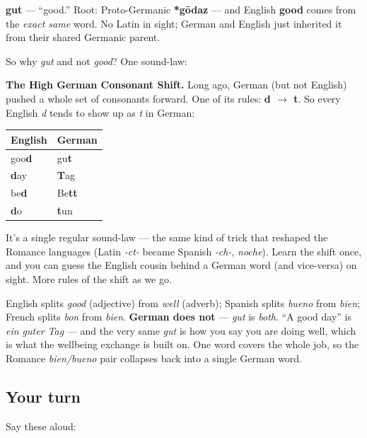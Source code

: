 \begin{cousinweb}
\textbf{gut} — \textquotedblleft{}good.\textquotedblright{} Root: Proto-Germanic \textbf{*gōdaz} — and English \textbf{good} comes from the \emph{exact same} word. No Latin in sight; German and English just inherited it from their shared Germanic parent.

So why \emph{gut} and not \emph{good}? One sound-law:

\textbf{The High German Consonant Shift.} Long ago, German (but not English) pushed a whole set of consonants forward. One of its rules: \textbf{d $\to$ t}. So every English \emph{d} tends to show up as \emph{t} in German:

\noindent
\begin{tabularx}{\linewidth}{@{}>{\raggedright\arraybackslash}X>{\raggedright\arraybackslash}X@{}}
\toprule
\textbf{English} & \textbf{German} \\
\midrule
goo\textbf{d} & gu\textbf{t} \\
\textbf{d}ay & \textbf{T}ag \\
be\textbf{d} & Be\textbf{tt} \\
\textbf{d}o & \textbf{t}un \\
\bottomrule
\end{tabularx}

It's a single regular sound-law — the same kind of trick that reshaped the Romance languages (Latin \emph{-ct-} became Spanish \emph{-ch-}, \emph{noche}). Learn the shift once, and you can guess the English cousin behind a German word (and vice-versa) on sight. More rules of the shift as we go.
\end{cousinweb}

\begin{grammarlens}[title={Grammar Lens: German merges \textquotedblleft{}good\textquotedblright{} and \textquotedblleft{}well\textquotedblright{}}]
English splits \emph{good} (adjective) from \emph{well} (adverb); Spanish splits \emph{bueno} from \emph{bien}; French splits \emph{bon} from \emph{bien}. \textbf{German does not} — \emph{gut} is \emph{both}. \textquotedblleft{}A good day\textquotedblright{} is \emph{ein guter Tag} — and the very same \emph{gut} is how you say you are doing well, which is what the wellbeing exchange is built on. One word covers the whole job, so the Romance \emph{bien/bueno} pair collapses back into a single German word.
\end{grammarlens}

\subsection*{Your turn}
Say these aloud:

